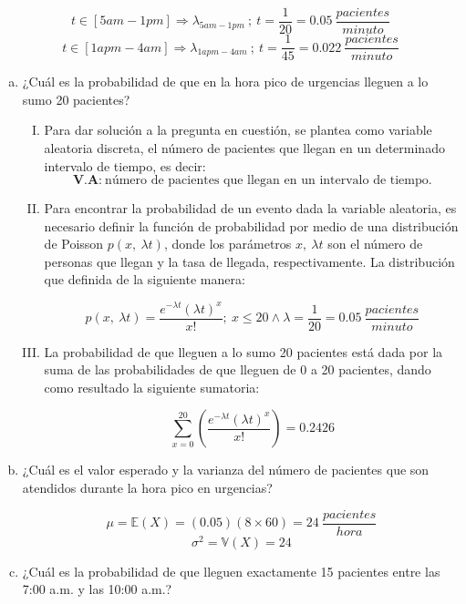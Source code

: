 \documentclass[11pt, spanish]{article}
\begin{document}
$$t \in \left[ 5am - 1pm \right] \Rightarrow \lambda_{5am - 1pm}\ ;\ t = \frac{1}{20} = 0.05\ \frac{pacientes}{minuto}$$
$$t \in \left[ 1apm - 4am \right] \Rightarrow \lambda_{1apm - 4am}\ ;\ t = \frac{1}{45} = 0.022\ \frac{pacientes}{minuto}$$

\begin{enumerate}[(a)]

\item ¿Cuál es la probabilidad de que en la hora pico de urgencias lleguen a lo sumo 20
pacientes?\\

\begin{enumerate}[(I)]

\item Para dar solución a la pregunta en cuestión, se plantea como variable aleatoria
discreta, el número de pacientes que llegan en un determinado intervalo de
tiempo, es decir:
$$\textbf{V.A:} \ \mbox{número de pacientes que llegan en un intervalo de tiempo}. $$

\item Para encontrar la probabilidad de un evento dada la variable aleatoria, es
necesario definir la función de probabilidad por medio de una distribución de
Poisson $p(x,\ \lambda t)$, donde los parámetros $x,\ \lambda t$ son el número de personas que llegan y la tasa de llegada, respectivamente. La distribución que definida de la
siguiente manera:

$$p(x,\ \lambda t) = \frac{e^{-\lambda t}(\lambda t)^x}{x!};\ x \leq 20 \wedge \lambda = \frac{1}{20} = 0.05\ \frac{pacientes}{minuto}$$

\item La probabilidad de que lleguen a lo sumo 20 pacientes está dada por la suma
de las probabilidades de que lleguen de 0 a 20 pacientes, dando como resultado la
siguiente sumatoria:

$$\sum_{x = 0}^{20} \left( \frac{e^{-\lambda t}(\lambda t)^{x}}{x!} \right) = 0.2426$$

\end{enumerate}

\item ¿Cuál es el valor esperado y la varianza del número de pacientes que son
atendidos durante la hora pico en urgencias?

$$\mu = \mathbb{E}(X) = (0.05)(8 \times 60) = 24 \ \frac{pacientes}{hora}$$
$$\sigma ^2 = \mathbb{V}(X) = 24$$

\item ¿Cuál es la probabilidad de que lleguen exactamente 15 pacientes entre las 7:00
a.m. y las 10:00 a.m.?\\


\end{enumerate}
\end{document}
